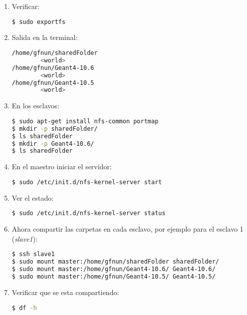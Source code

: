 \begin{enumerate}
    \item Verificar:
    
\begin{lstlisting}[language=bash,style=mystyle]    
$ sudo exportfs
\end{lstlisting} 


    \item Salida en la terminal:
    
\begin{lstlisting}[language=bash,style=mystyle]    
/home/gfnun/sharedFolder
		<world>
/home/gfnun/Geant4-10.6
		<world>
/home/gfnun/Geant4-10.5
		<world>
\end{lstlisting} 


    \item En los esclavos:
    
\begin{lstlisting}[language=bash,style=mystyle]    
$ sudo apt-get install nfs-common portmap
$ mkdir -p sharedFolder/
$ ls sharedFolder
$ mkdir -p Geant4-10.6/
$ ls sharedFolder
\end{lstlisting} 


    \item En el maestro iniciar el servidor:
    
\begin{lstlisting}[language=bash,style=mystyle]    
$ sudo /etc/init.d/nfs-kernel-server start
\end{lstlisting} 


    \item Ver el estado:
    
\begin{lstlisting}[language=bash,style=mystyle]    
$ sudo /etc/init.d/nfs-kernel-server status
\end{lstlisting} 

    \item Ahora compartir las carpetas en cada esclavo, por ejemplo para el esclavo 1 (\emph{slave1}):
    
\begin{lstlisting}[language=bash,style=mystyle] 
$ ssh slave1
$ sudo mount master:/home/gfnun/sharedFolder sharedFolder/
$ sudo mount master:/home/gfnun/Geant4-10.6/ Geant4-10.6/
$ sudo mount master:/home/gfnun/Geant4-10.5/ Geant4-10.5/
\end{lstlisting} 


    \item Verificar que se esta compartiendo:
    
\begin{lstlisting}[language=bash,style=mystyle]    
$ df -h
\end{lstlisting}



\end{enumerate}
